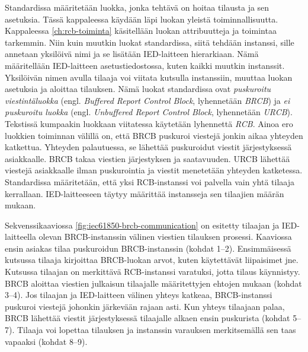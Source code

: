 Standardissa määritetään luokka, jonka tehtävä on hoitaa tilausta ja sen asetuksia. Tässä kappaleessa käydään läpi luokan yleistä toiminnallisuutta. Kappaleessa \ref{ch:rcb-toiminta} käsitellään luokan attribuutteja ja toimintaa tarkemmin. Niin kuin muutkin luokat standardissa, siitä tehdään instanssi, sille annetaan yksilöivä nimi ja se lisätään IED-laitteen hierarkiaan. Nämä määritellään IED-laitteen asetustiedostossa, kuten kaikki muutkin instanssit. Yksilöivän nimen avulla tilaaja voi viitata kutsulla instanssiin, muuttaa luokan asetuksia ja aloittaa tilauksen. Nämä luokat standardissa ovat \emph{puskuroitu viestintäluokka} (engl. \emph{Buffered Report Control Block}, lyhennetään \emph{BRCB}) ja \emph{ei puskuroitu luokka} (engl. \emph{Unbuffered Report Control Block}, lyhennetään \emph{URCB}). Tekstissä kumpaakin luokkaan viitatessa käytetään lyhennettä \emph{RCB}. Ainoa ero luokkien toiminnan välillä on, että BRCB puskuroi viestejä jonkin aikaa yhteyden katkettua. Yhteyden palautuessa, se lähettää puskuroidut viestit järjestyksessä asiakkaalle. BRCB takaa viestien järjestyksen ja saatavuuden. URCB lähettää viestejä asiakkaalle ilman puskurointia ja viestit menetetään yhteyden katketessa. Standardissa määritetään, että yksi RCB-instanssi voi palvella vain yhtä tilaaja kerrallaan. IED-laitteeseen täytyy määrittää instansseja sen tilaajien määrän mukaan. \mbox{\cite[s.~93]{IEC61850-7-2}}

Sekvenssikaaviossa \ref{fig:iec61850-brcb-communication} on esitetty tilaajan ja IED-laitteella olevan BRCB-instanssin välinen viestien tilauksen prosessi. Kaaviossa ensin asiakas tilaa puskuroidun BRCB-ins\-tans\-sin (kohdat 1--2). Ensimmäisessä kutsussa tilaaja kirjoittaa BRCB-luokan arvot, kuten käytettävät liipaisimet jne. Kutsussa tilaajan on merkittävä RCB-ins\-tans\-si varatuksi, jotta tilaus käynnistyy. BRCB aloittaa viestien julkaisun tilaajalle määritettyjen ehtojen mukaan (kohdat 3--4). Jos tilaajan ja IED-laitteen välinen yhteys katkeaa, BRCB-instanssi puskuroi viestejä johonkin järkevään rajaan asti. Kun yhteys tilaajaan palaa, BRCB lähettää viestit järjestyksessä tilaajalle alkaen ensin puskurista (kohdat 5--7). Tilaaja voi lopettaa tilauksen ja instanssin varauksen merkitsemällä sen taas vapaaksi (kohdat 8--9). \mbox{\cite[s.~41--42]{IEC61850-7-1}}

